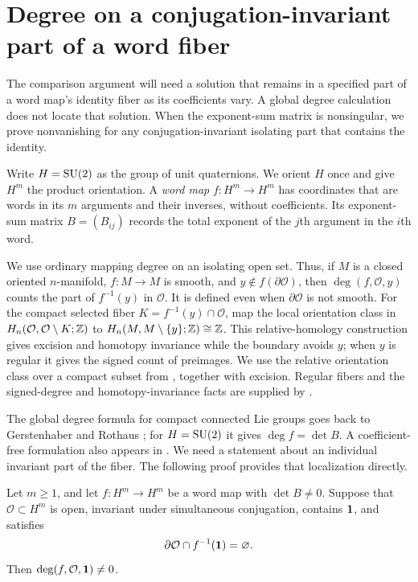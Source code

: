 \section{Degree on a conjugation-invariant part of a word fiber}
\label{sec:degree}

The comparison argument will need a solution that remains in a specified
part of a word map's identity fiber as its coefficients vary. A global
degree calculation does not locate that solution. When the exponent-sum matrix is nonsingular, we prove nonvanishing
for any conjugation-invariant isolating part that contains the identity.

Write $H=\operatorname{SU}(2)$ as the group of unit quaternions. We orient $H$ once and give $H^m$ the product orientation. A \emph{word map} $f:H^m\to H^m$ has coordinates that are words in its $m$ arguments and their inverses, without coefficients. Its exponent-sum matrix $B=(B_{ij})$ records the total exponent of the $j$th argument in the $i$th word.

We use ordinary mapping degree on an isolating open set. Thus, if $M$ is a closed oriented $n$-manifold, $f:M\to M$ is smooth, and $y\notin f(\partial\mathcal O)$, then $\deg(f,\mathcal O,y)$ counts the part of $f^{-1}(y)$ in $\mathcal O$. It is defined even when $\partial\mathcal O$ is not smooth. For the compact selected fiber $K=f^{-1}(y)\cap\mathcal O$, map the local orientation class in $H_n(\mathcal O,\mathcal O\setminus K;\mathbb Z)$ to $H_n(M,M\setminus\{y\};\mathbb Z)\cong\mathbb Z$. This relative-homology construction gives excision and homotopy invariance while the boundary avoids $y$; when $y$ is regular it gives the signed count of preimages. We use the relative orientation class over a compact subset from \cite[Lemma~3.27(a)]{Hatcher2002}, together with excision. Regular fibers and the signed-degree and homotopy-invariance facts are supplied by \cite[Section~2, Lemmas~1--2; Section~5, Theorems~A--B]{Milnor1965}.

The global degree formula for compact connected Lie groups goes back to Gerstenhaber and Rothaus \cite[Theorem~1]{GR1962}; for $H=\operatorname{SU}(2)$ it gives $\deg f=\det B$. A coefficient-free formulation also appears in \cite[Proposition~2.1]{Froyshov2013}. We need a statement about an individual invariant part of the fiber. The following proof provides that localization directly.

\begin{samepage}
\begin{lemma}
\label{lem:localized-degree}
Let $m\ge1$, and let $f:H^m\to H^m$ be a word map with $\det B\ne0$. Suppose that $\mathcal O\subset H^m$ is open, invariant under simultaneous conjugation, contains $\mathbf 1$, and satisfies
\[
 \partial\mathcal O\cap f^{-1}(\mathbf 1)=\varnothing.
\]
Then $\deg(f,\mathcal O,\mathbf 1)\ne0$.
\end{lemma}
\end{samepage}

